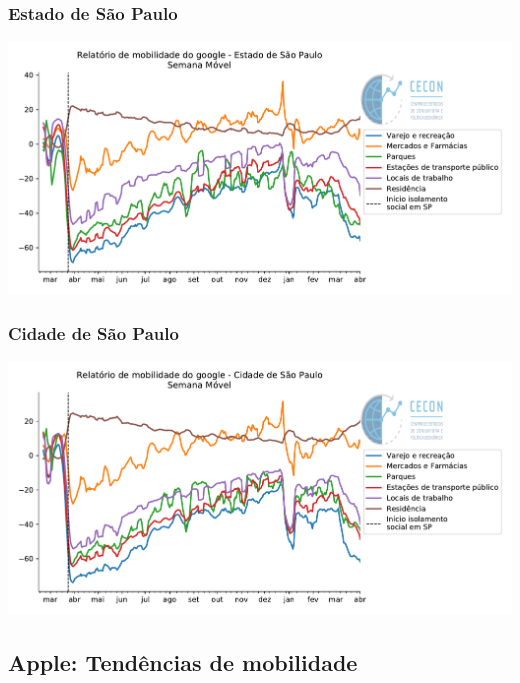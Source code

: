 \documentclass{SelfArx}
\begin{document}
\subsubsection*{Estado de São Paulo}
\label{sec:org9abd089}

\begin{center}
\includegraphics[width=.9\linewidth]{./figs/Granulares/GoogleReport_EstadoSP.pdf}
\end{center}

\subsubsection*{Cidade de São Paulo}
\label{sec:orgdc33422}

\begin{center}
\includegraphics[width=.9\linewidth]{./figs/Granulares/GoogleReport_CidadeSP.pdf}
\end{center}

\subsection*{Apple: Tendências de mobilidade}
\label{sec:org20b458f}
\end{document}
